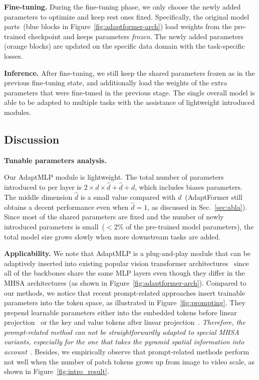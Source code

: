 \textbf{Fine-tuning.} During the fine-tuning phase, we only choose the newly added parameters to optimize and keep rest ones fixed. Specifically, the original model parts~(\textcolor{ice}{blue} blocks in Figure~\ref{fig:adaptformer-arch}) load weights from the pre-trained checkpoint and keeps parameters \textit{frozen}. The newly added parameters (\textcolor{fire}{orange} blocks) are updated on the specific data domain with the task-specific losses. 

\textbf{Inference.} After fine-tuning, we still keep the shared parameters frozen as in the previous fine-tuning state, and additionally load the weights of the extra parameters that were fine-tuned in the previous stage. The single overall model is able to be adapted to multiple tasks with the assistance of lightweight introduced modules.

\subsection{Discussion}\label{sec:num_parameters}

{\textbf{Tunable parameters analysis.}}

Our AdaptMLP module is lightweight. The total number of parameters introduced to per layer is $2\times d\times \hat{d} + \hat{d} + d$, which includes biases parameters. The middle dimension $\hat{d}$ is a small value compared with $d$~(AdaptFormer still obtains a decent performance even when $\hat{d} = 1$, as discussed in Sec.~\ref{sec:abla}). Since most of the shared parameters are fixed and the number of newly introduced parameters is small~($< 2\%$ of the pre-trained model parameters), the total model size grows slowly when more downstream tasks are added.

\textbf{Applicability.} We note that AdaptMLP is a plug-and-play module that can be adaptively inserted into existing popular vision transformer architectures~\cite{dosovitskiy-2020-vit, liu-iccv21-swin, wang2021pyramid, yuan2021tokens, chu2021Twins, dong2021cswin} since all of the backbones share the same MLP layers even though they differ in the MHSA architectures (as shown in Figure~\ref{fig:adaptformer-arch}). Compared to our methods, we notice that recent prompt-related approaches insert trainable parameters into the token space, as illustrated in Figure~\ref{fig:prompting}. They prepend learnable parameters either into the embedded tokens before linear projection~\cite{li-2021-prefix} or the key and value tokens after linear projection~\cite{jia-2022-vpt}. \textit{Therefore, the prompt-related method can not be straightforwardly adapted to special MHSA variants, especially for the one that takes the pyramid spatial information into account}~\cite{liu-iccv21-swin,wang2021pyramid}. Besides, we empirically observe that prompt-related methods perform not well when the number of patch tokens grows up from image to video scale, as shown in Figure~\ref{fig:intro_result}.

